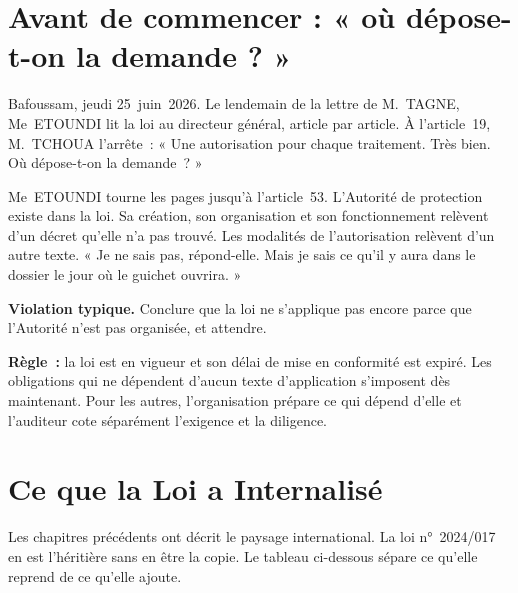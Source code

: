 \bigskip

\section*{Avant de commencer : « où dépose-t-on la demande ? »}

Bafoussam, jeudi 25~juin~2026. Le lendemain de la lettre de M.~TAGNE, Me~ETOUNDI
lit la loi au directeur général, article par article. À l'article~19,
M.~TCHOUA l'arrête~: « Une autorisation pour chaque traitement. Très bien.
Où dépose-t-on la demande~? »

Me~ETOUNDI tourne les pages jusqu'à l'article~53. L'Autorité de protection
existe dans la loi. Sa création, son organisation et son fonctionnement
relèvent d'un décret qu'elle n'a pas trouvé. Les modalités de l'autorisation
relèvent d'un autre texte. « Je ne sais pas, répond-elle. Mais je sais ce
qu'il y aura dans le dossier le jour où le guichet ouvrira. »

\begin{boxalert}
\textbf{Violation typique.} Conclure que la loi ne s'applique pas encore
parce que l'Autorité n'est pas organisée, et attendre.

\smallskip
\textbf{Règle~:} la loi est en vigueur et son délai de mise en conformité est
expiré. Les obligations qui ne dépendent d'aucun texte d'application
s'imposent dès maintenant. Pour les autres, l'organisation prépare ce qui
dépend d'elle et l'auditeur cote séparément l'exigence et la diligence.
\end{boxalert}

\section{Ce que la Loi a Internalisé}
\label{sec:c06-internalise}

Les chapitres précédents ont décrit le paysage international. La loi
n°~2024/017 en est l'héritière sans en être la copie. Le tableau
ci-dessous sépare ce qu'elle reprend de ce qu'elle ajoute.

